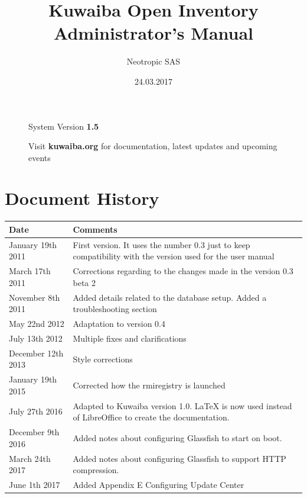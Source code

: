 \documentclass[a4paper]{article}
\title{Kuwaiba Open Inventory Administrator's Manual}
\author{Neotropic SAS}
\date{24.03.2017}
\begin{document}
	\maketitle
	
	
	
	\begin{figure}[b]
		\centering System Version \textbf{1.5}
			
		Visit \textbf{kuwaiba.org} for documentation, latest updates and upcoming events
	\end{figure}
	
	
	\newpage
	
	\tableofcontents

	\newpage
	\section{Document History}
		\begin{table}[h!]
			\centering
			\begin{tabular}{l||p{10cm}} %
				\toprule
				\textbf{Date} & \textbf{Comments}  \\
				\midrule
				January 19th 2011 & First version. It uses the number 0.3 just to keep compatibility with the version used for the user manual\\
				\midrule
				March 17th 2011 & Corrections regarding to the changes made in the version 0.3 beta 2 \\
				\midrule
				November 8th  2011 & Added details related to the database setup. Added a troubleshooting section \\
				\midrule
				May 22nd 2012 & Adaptation to version 0.4 \\
				\midrule
				July 13th 2012 & Multiple fixes and clarifications \\
				\midrule
				December 12th 2013 & Style corrections \\
				\midrule
				January 19th 2015 & Corrected how the rmiregistry is launched \\
				\midrule
				July 27th 2016 & Adapted to Kuwaiba version 1.0. LaTeX is now used instead of LibreOffice to create the documentation. \\
				\midrule
				December 9th 2016 & Added notes about configuring Glassfish to start on boot. \\
				\midrule
				March 24th 2017 & Added notes about configuring Glassfish to support HTTP compression. \\
				\midrule
				June 1th 2017 & Added Appendix E Configuring Update Center\\
				\bottomrule
			\end{tabular}	
				
		\end{table}
	\newpage
\end{document}
